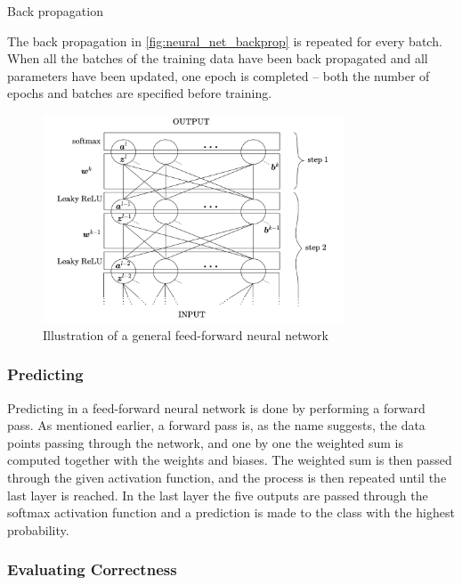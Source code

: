 \documentclass[../main.tex]{subfiles}
\begin{document}
\begin{algorithm}[!ht]
    
    \caption{Back propagation}
    \label{alg:back_prop}
\end{algorithm}

The back propagation in \autoref{fig:neural_net_backprop} is 
repeated for every batch. When all the batches of the 
training data have been back propagated and all parameters have 
been updated, one epoch is completed -- both the number of epochs 
and batches are specified before training.

 \begin{figure}[ht]
    \centering
    \includegraphics[width=0.8\textwidth]
    {images/neural_network.png}
    \caption{Illustration of a general feed-forward neural 
    network}
    \label{fig:neural_net_backprop}
\end{figure}


\subsubsection{Predicting}

Predicting in a feed-forward neural network is done by performing 
a forward pass. As mentioned earlier, a forward pass is, as the 
name suggests, the data points passing through the network, and 
one by one the weighted sum is computed together with the weights 
and biases. The weighted sum is then passed through the given 
activation function, and the process is then repeated until the 
last layer is reached. 
In the last layer the five outputs are 
passed through the softmax activation function and a prediction 
is made to the class with the highest probability.


\subsubsection{Evaluating Correctness}
\end{document}

